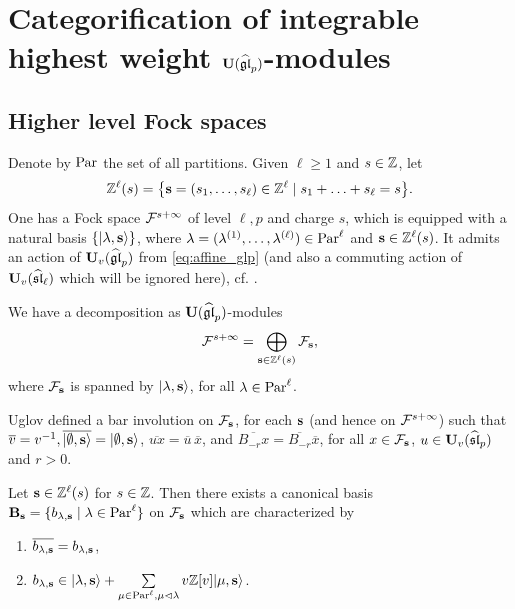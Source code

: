 \section{Categorification of integrable highest weight $\bold{U}({\widehat{\mathfrak{gl}}_p})$-modules}
\label{sec:Cat}

\subsection{Higher level Fock spaces}

Denote by $\text{Par}$ the set of all partitions. Given $\ell\ge 1$ and $s\in \mathbb{Z}$, let 
\begin{align} \label{eq:Zls}
\mathbb{Z}^\ell(s) =\big\{\mathbf{s} =(s_1, \ldots, s_\ell) \in \mathbb{Z}^\ell \mid s_1+ \ldots+ s_\ell =s \big\}.
\end{align}
One has a Fock space $\mathcal{F}^{s+\infty}$ of level $\ell, p$ and charge $s$, which is equipped with a natural basis $\{|\lambda, \mathbf{s} \rangle \}$, where $\lambda =(\lambda^{(1)}, \ldots, \lambda^{(\ell)}) \in \text{Par}^\ell$ and $\mathbf{s} \in \mathbb{Z}^\ell(s)$. It admits an action of $\bold{U}_v(\widehat{\mathfrak{gl}}_p)$ from \eqref{eq:affine_glp} (and also a commuting action of $\bold{U}_v(\widehat{\mathfrak{sl}}_\ell)$ which will be ignored here), cf. \cite{JMMO91, Ugl00}. 

We have a decomposition as $\bold{U}(\widehat{\mathfrak{gl}}_p)$-modules
\[
\mathcal{F}^{s+\infty} = \bigoplus_{\mathbf{s} \in \mathbb{Z}^\ell(s)} \mathcal{F}_{\mathbf{s}}, 
\]
where $\mathcal{F}_{\mathbf{s}}$ is spanned by $|\lambda, \mathbf{s} \rangle$, for all $\lambda \in \text{Par}^\ell$. 

Uglov \cite{Ugl00} defined a bar involution on $\mathcal{F}_{\mathbf{s}}$, for each $\mathbf{s}$ (and hence on $\mathcal{F}^{s+\infty}$) such that
$\overline{v}=v^{-1}, \overline{|\emptyset, \mathbf{s} \rangle} =|\emptyset, \mathbf{s} \rangle$, $\overline{ux} =\overline{u}\,\overline{x}$, and $\overline{B_{-r}x} =\overline{B_{-r}}\overline{x}$, for all $x\in \mathcal{F}_{\mathbf{s}}$, $u \in \bold{U}_v(\widehat{\mathfrak{sl}}_p)$ and $r>0$. 

\begin{theorem} \cite{Ugl00}
Let $\mathbf{s}\in \mathbb{Z}^\ell(s)$ for $s\in \mathbb{Z}$. 
Then there exists a canonical basis $\mathbf{B}_{\mathbf{s}} =\{b_{\lambda,\mathbf{s}} \mid \lambda \in \text{Par}^\ell \}$ 
on $\mathcal{F}_{\mathbf{s}}$ which are characterized by 
\begin{enumerate}
    \item 
$\overline{b_{\lambda,\mathbf{s}}} =b_{\lambda,\mathbf{s}}$,
    \item
$b_{\lambda,\mathbf{s}} \in |\lambda, \mathbf{s} \rangle + \sum\limits_{\mu \in \text{Par}^\ell,\mu \lhd \lambda} v\mathbb{Z}[v] |\mu, \mathbf{s} \rangle$.
\end{enumerate}
\end{theorem}

